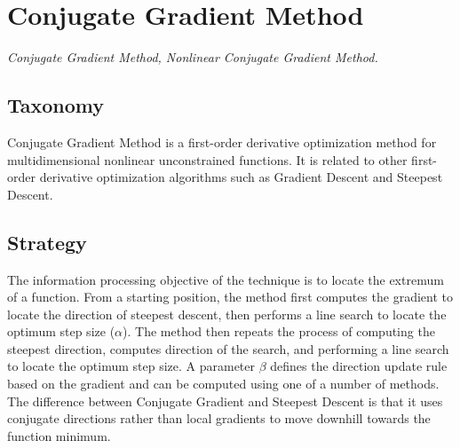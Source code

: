 
\section{Conjugate Gradient Method} 
\label{sec:conjugate_gradient}

\emph{Conjugate Gradient Method, Nonlinear Conjugate Gradient Method.}

\subsection{Taxonomy}
Conjugate Gradient Method is a first-order derivative optimization method for multidimensional nonlinear unconstrained functions.
It is related to other first-order derivative optimization algorithms such as Gradient Descent and Steepest Descent.

\subsection{Strategy}
The information processing objective of the technique is to locate the extremum of a function.
From a starting position, the method first computes the gradient to locate the direction of steepest descent, then performs a line search to locate the optimum step size ($\alpha$). The method then repeats the process of computing the steepest direction, computes direction of the search, and performing a line search to locate the optimum step size. A parameter $\beta$ defines the direction update rule based on the gradient and can be computed using one of a number of methods.
The difference between Conjugate Gradient and Steepest Descent is that it uses conjugate directions rather than local gradients to move downhill towards the function minimum.

